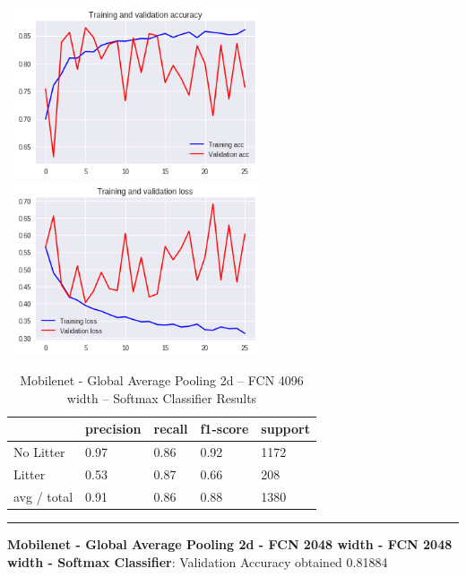 \documentclass{IEEEtran}
\begin{document}
 \includegraphics[width=3in,height=2in]{mobilenet-img/mobilenet-img009.png} 
\includegraphics[width=3in,height=2in]{mobilenet-img/mobilenet-img010.png} 

\begin{table}[ht]
\centering
\caption{Mobilenet - Global Average Pooling 2d -- FCN 4096 width -- Softmax Classifier Results}
\begin{tabular}{|l|l|l|l|l|} 
\hline
 & precision & recall  & f1-score  & support \\\hline
No Litter &
0.97 &
0.86 &
0.92 &
1172 \\\hline
Litter &
0.53 &
0.87 &
0.66 &
208 \\\hline
avg / total &
0.91 &
0.86 &
0.88 &
1380\\\hline
\end{tabular}
\end{table}

\begin{center}\noindent\rule{8cm}{0.4pt}\end{center}


\bigskip

\textbf{Mobilenet - Global Average Pooling 2d - FCN 2048 width - FCN 2048 width - Softmax Classifier}: Validation Accuracy obtained
0.81884


\bigskip


\bigskip
\end{document}
